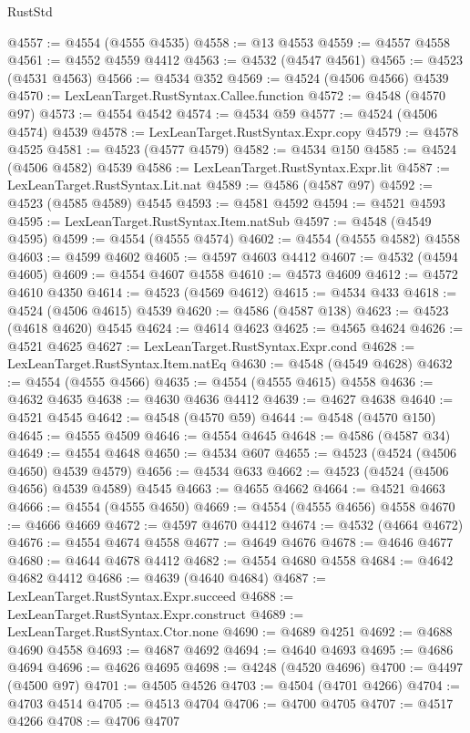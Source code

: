 \begin{lexlean}{RustStd}
\begin{coremodule}
@4557 := @4554 (@4555 @4535)
@4558 := @13 @4553
@4559 := @4557 @4558
@4561 := @4552 @4559 @4412
@4563 := @4532 (@4547 @4561)
@4565 := @4523 (@4531 @4563)
@4566 := @4534 @352
@4569 := @4524 (@4506 @4566) @4539
@4570 := LexLeanTarget.RustSyntax.Callee.function
@4572 := @4548 (@4570 @97)
@4573 := @4554 @4542
@4574 := @4534 @59
@4577 := @4524 (@4506 @4574) @4539
@4578 := LexLeanTarget.RustSyntax.Expr.copy
@4579 := @4578 @4525
@4581 := @4523 (@4577 @4579)
@4582 := @4534 @150
@4585 := @4524 (@4506 @4582) @4539
@4586 := LexLeanTarget.RustSyntax.Expr.lit
@4587 := LexLeanTarget.RustSyntax.Lit.nat
@4589 := @4586 (@4587 @97)
@4592 := @4523 (@4585 @4589) @4545
@4593 := @4581 @4592
@4594 := @4521 @4593
@4595 := LexLeanTarget.RustSyntax.Item.natSub
@4597 := @4548 (@4549 @4595)
@4599 := @4554 (@4555 @4574)
@4602 := @4554 (@4555 @4582) @4558
@4603 := @4599 @4602
@4605 := @4597 @4603 @4412
@4607 := @4532 (@4594 @4605)
@4609 := @4554 @4607 @4558
@4610 := @4573 @4609
@4612 := @4572 @4610 @4350
@4614 := @4523 (@4569 @4612)
@4615 := @4534 @433
@4618 := @4524 (@4506 @4615) @4539
@4620 := @4586 (@4587 @138)
@4623 := @4523 (@4618 @4620) @4545
@4624 := @4614 @4623
@4625 := @4565 @4624
@4626 := @4521 @4625
@4627 := LexLeanTarget.RustSyntax.Expr.cond
@4628 := LexLeanTarget.RustSyntax.Item.natEq
@4630 := @4548 (@4549 @4628)
@4632 := @4554 (@4555 @4566)
@4635 := @4554 (@4555 @4615) @4558
@4636 := @4632 @4635
@4638 := @4630 @4636 @4412
@4639 := @4627 @4638
@4640 := @4521 @4545
@4642 := @4548 (@4570 @59)
@4644 := @4548 (@4570 @150)
@4645 := @4555 @4509
@4646 := @4554 @4645
@4648 := @4586 (@4587 @34)
@4649 := @4554 @4648
@4650 := @4534 @607
@4655 := @4523 (@4524 (@4506 @4650) @4539 @4579)
@4656 := @4534 @633
@4662 := @4523 (@4524 (@4506 @4656) @4539 @4589) @4545
@4663 := @4655 @4662
@4664 := @4521 @4663
@4666 := @4554 (@4555 @4650)
@4669 := @4554 (@4555 @4656) @4558
@4670 := @4666 @4669
@4672 := @4597 @4670 @4412
@4674 := @4532 (@4664 @4672)
@4676 := @4554 @4674 @4558
@4677 := @4649 @4676
@4678 := @4646 @4677
@4680 := @4644 @4678 @4412
@4682 := @4554 @4680 @4558
@4684 := @4642 @4682 @4412
@4686 := @4639 (@4640 @4684)
@4687 := LexLeanTarget.RustSyntax.Expr.succeed
@4688 := LexLeanTarget.RustSyntax.Expr.construct
@4689 := LexLeanTarget.RustSyntax.Ctor.none
@4690 := @4689 @4251
@4692 := @4688 @4690 @4558
@4693 := @4687 @4692
@4694 := @4640 @4693
@4695 := @4686 @4694
@4696 := @4626 @4695
@4698 := @4248 (@4520 @4696)
@4700 := @4497 (@4500 @97)
@4701 := @4505 @4526
@4703 := @4504 (@4701 @4266)
@4704 := @4703 @4514
@4705 := @4513 @4704
@4706 := @4700 @4705
@4707 := @4517 @4266
@4708 := @4706 @4707

\end{coremodule}
\end{lexlean}
